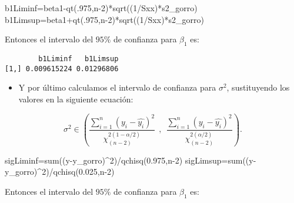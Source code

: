 \documentclass[
  a4paper,
  oneside,
  openany]{book}
\newenvironment{Shaded}{\begin{snugshade}}{\end{snugshade}}
\newcommand{\DecValTok}[1]{\textcolor[rgb]{0.00,0.00,0.81}{#1}}
\newcommand{\FloatTok}[1]{\textcolor[rgb]{0.00,0.00,0.81}{#1}}
\newcommand{\FunctionTok}[1]{\textcolor[rgb]{0.00,0.00,0.00}{#1}}
\newcommand{\NormalTok}[1]{#1}
\newcommand{\OtherTok}[1]{\textcolor[rgb]{0.56,0.35,0.01}{#1}}
\newcommand{\SpecialCharTok}[1]{\textcolor[rgb]{0.00,0.00,0.00}{#1}}
\providecommand{\tightlist}{%
  \setlength{\itemsep}{0pt}\setlength{\parskip}{0pt}}
\begin{document}
\begin{Shaded}
\begin{Highlighting}[]
\NormalTok{b1Liminf}\OtherTok{=}\NormalTok{beta1}\SpecialCharTok{{-}}\FunctionTok{qt}\NormalTok{(.}\DecValTok{975}\NormalTok{,n}\DecValTok{{-}2}\NormalTok{)}\SpecialCharTok{*}\FunctionTok{sqrt}\NormalTok{((}\DecValTok{1}\SpecialCharTok{/}\NormalTok{Sxx)}\SpecialCharTok{*}\NormalTok{s2\_gorro) }
\NormalTok{b1Limsup}\OtherTok{=}\NormalTok{beta1}\SpecialCharTok{+}\FunctionTok{qt}\NormalTok{(.}\DecValTok{975}\NormalTok{,n}\DecValTok{{-}2}\NormalTok{)}\SpecialCharTok{*}\FunctionTok{sqrt}\NormalTok{((}\DecValTok{1}\SpecialCharTok{/}\NormalTok{Sxx)}\SpecialCharTok{*}\NormalTok{s2\_gorro) }
\end{Highlighting}
\end{Shaded}

Entonces el intervalo del \(95\%\) de confianza para \(\beta_{1}\) es:

\begin{verbatim}
        b1Liminf   b1Limsup
[1,] 0.009615224 0.01296806
\end{verbatim}

\begin{itemize}
\tightlist
\item
  Y por último calculamos el intervalo de confianza para \(\sigma^2\), sustituyendo los valores en la siguiente ecuación:
\end{itemize}

\[\sigma^2 \in \left( \frac{\sum_{i=1}^{n}(y_i-\hat{y_{i}})^2}{\chi^{2(1-\alpha/2)}_{(n-2)}} \ \ , \ \ \frac{\sum_{i=1}^{n}(y_i-\hat{y_{i}})^2} {\chi^{2(\alpha/2)}_{(n-2)}} \right).\]

\begin{Shaded}
\begin{Highlighting}[]
\NormalTok{sigLiminf}\OtherTok{=}\FunctionTok{sum}\NormalTok{((y}\SpecialCharTok{{-}}\NormalTok{y\_gorro)}\SpecialCharTok{\^{}}\DecValTok{2}\NormalTok{)}\SpecialCharTok{/}\FunctionTok{qchisq}\NormalTok{(}\FloatTok{0.975}\NormalTok{,n}\DecValTok{{-}2}\NormalTok{) }
\NormalTok{sigLimsup}\OtherTok{=}\FunctionTok{sum}\NormalTok{((y}\SpecialCharTok{{-}}\NormalTok{y\_gorro)}\SpecialCharTok{\^{}}\DecValTok{2}\NormalTok{)}\SpecialCharTok{/}\FunctionTok{qchisq}\NormalTok{(}\FloatTok{0.025}\NormalTok{,n}\DecValTok{{-}2}\NormalTok{) }
\end{Highlighting}
\end{Shaded}

Entonces el intervalo del \(95\%\) de confianza para \(\beta_{1}\) es:
\end{document}
